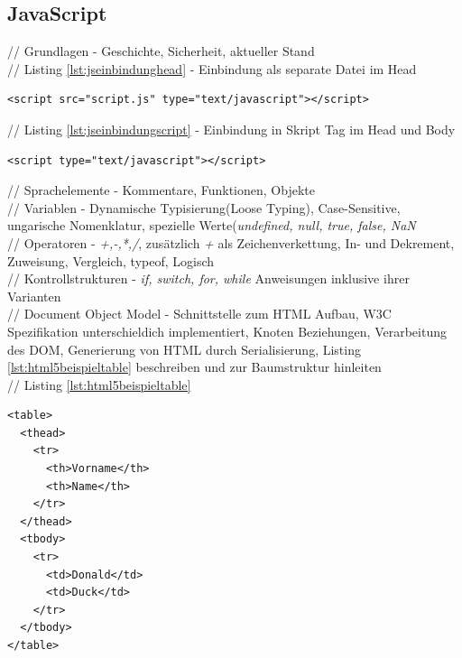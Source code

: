 \documentclass[12pt,a4paper,bibliography=totocnumbered,listof=totocnumbered]{scrartcl}
\begin{document}
\subsection{JavaScript}
// Grundlagen - Geschichte, Sicherheit, aktueller Stand\\
// Listing \ref{lst:jseinbindunghead} - Einbindung als separate Datei im Head
	\vspace{1em}
	\begin{lstlisting}[caption=JavaScript Einbindung als separate Datei im \textit{head}-Element, label=lst:jseinbindunghead]
<script src="script.js" type="text/javascript"></script>
	\end{lstlisting}

// Listing \ref{lst:jseinbindungscript} - Einbindung in Skript Tag im Head und Body
	\vspace{1em}
	\begin{lstlisting}[caption=JavaScript Einbindung in Skript Element im \textit{head}- und \textit{body}-Element, label=lst:jseinbindungscript]
<script type="text/javascript"></script>
	\end{lstlisting}

// Sprachelemente - Kommentare, Funktionen, Objekte\\

// Variablen - Dynamische Typisierung(Loose Typing), Case-Sensitive, ungarische Nomenklatur, spezielle Werte(\textit{undefined, null, true, false, NaN}\\

// Operatoren - \textit{+,-,*,/}, zusätzlich \textit{+} als Zeichenverkettung, In- und Dekrement, Zuweisung, Vergleich, typeof, Logisch\\

// Kontrollstrukturen - \textit{if, switch, for, while} Anweisungen inklusive ihrer Varianten\\

// Document Object Model - Schnittstelle zum HTML Aufbau, W3C Spezifikation unterschieldich implementiert, Knoten Beziehungen, Verarbeitung des DOM, Generierung von HTML durch Serialisierung, Listing \ref{lst:html5beispieltable} beschreiben und zur Baumstruktur hinleiten\\
// Listing \ref{lst:html5beispieltable}
	\vspace{1em}
	\begin{lstlisting}[caption=DOM5 Beispiel Definition, label=lst:html5beispieltable]
<table>
  <thead>
    <tr>
      <th>Vorname</th>
      <th>Name</th>
    </tr>
  </thead>
  <tbody>
    <tr>
      <td>Donald</td>
      <td>Duck</td>
    </tr>
  </tbody>
</table>
	\end{lstlisting}
\end{document}
